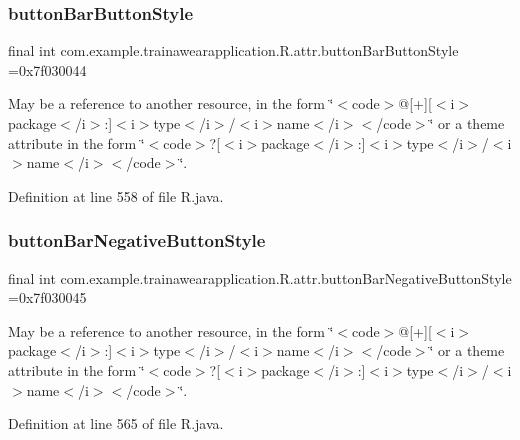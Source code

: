 \subsubsection{\texorpdfstring{buttonBarButtonStyle}{buttonBarButtonStyle}}
{\footnotesize\ttfamily final int com.\+example.\+trainawearapplication.\+R.\+attr.\+button\+Bar\+Button\+Style =0x7f030044\hspace{0.3cm}{\ttfamily [static]}}

May be a reference to another resource, in the form \char`\"{}$<$code$>$@\mbox{[}+\mbox{]}\mbox{[}$<$i$>$package$<$/i$>$\+:\mbox{]}$<$i$>$type$<$/i$>$/$<$i$>$name$<$/i$>$$<$/code$>$\char`\"{} or a theme attribute in the form \char`\"{}$<$code$>$?\mbox{[}$<$i$>$package$<$/i$>$\+:\mbox{]}$<$i$>$type$<$/i$>$/$<$i$>$name$<$/i$>$$<$/code$>$\char`\"{}. 

Definition at line 558 of file R.\+java.

\mbox{\label{classcom_1_1example_1_1trainawearapplication_1_1_r_1_1attr_a41f5e6623fb45ddd8bcd10ccbb32e4f4}} 
\subsubsection{\texorpdfstring{buttonBarNegativeButtonStyle}{buttonBarNegativeButtonStyle}}
{\footnotesize\ttfamily final int com.\+example.\+trainawearapplication.\+R.\+attr.\+button\+Bar\+Negative\+Button\+Style =0x7f030045\hspace{0.3cm}{\ttfamily [static]}}

May be a reference to another resource, in the form \char`\"{}$<$code$>$@\mbox{[}+\mbox{]}\mbox{[}$<$i$>$package$<$/i$>$\+:\mbox{]}$<$i$>$type$<$/i$>$/$<$i$>$name$<$/i$>$$<$/code$>$\char`\"{} or a theme attribute in the form \char`\"{}$<$code$>$?\mbox{[}$<$i$>$package$<$/i$>$\+:\mbox{]}$<$i$>$type$<$/i$>$/$<$i$>$name$<$/i$>$$<$/code$>$\char`\"{}. 

Definition at line 565 of file R.\+java.

\mbox{\label{classcom_1_1example_1_1trainawearapplication_1_1_r_1_1attr_a60dce193206c761a96e6246383b7c600}} 
